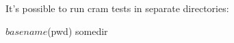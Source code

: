 It's possible to run cram tests in separate directories:

\begin{sh}
$ basename $(pwd)
somedir
\end{sh}
